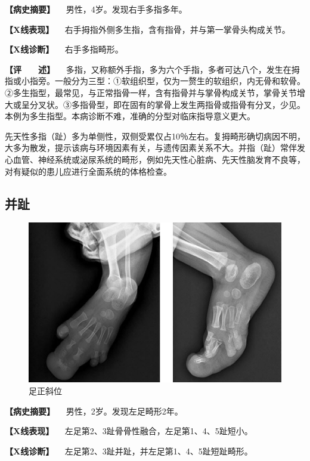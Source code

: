 \textbf{【病史摘要】} 　男性，4岁。发现右手多指多年。

\textbf{【X线表现】}
　右手拇指外侧多生指，含有指骨，并与第一掌骨头构成关节。

\textbf{【X线诊断】} 　右手多指畸形。

\textbf{【评　　述】}
　多指，又称额外手指，多为六个手指，多者可达八个，发生在拇指或小指旁。一般分为三型：①软组织型，仅为一赘生的软组织，内无骨和软骨。②多生指型，最常见，与正常指骨一样，含有指骨并与掌骨构成关节，掌骨关节增大或呈分叉状。③多指骨型，即在固有的掌骨上发生两指骨或指骨有分叉，少见。本例为多生指型。本病诊断不难，准确的分型对临床指导意义更大。

先天性多指（趾）多为单侧性，双侧受累仅占10％左右。复拇畸形确切病因不明，大多为散发，提示该病与环境因素有关，与遗传因素关系不大。并指（趾）常伴发心血管、神经系统或泌尿系统的畸形，例如先天性心脏病、先天性脑发育不良等，对有疑似的患儿应进行全面系统的体格检查。

\subsection{并趾}

\begin{figure}[!htbp]
 \centering
 \includegraphics{./images/Image00025.jpg}
 \captionsetup{justification=centering}
 \caption{足正斜位}
 \label{fig2-2-8}
  \end{figure} 

\textbf{【病史摘要】} 　男性，2岁。发现左足畸形2年。

\textbf{【X线表现】} 　左足第2、3趾骨骨性融合，左足第1、4、5趾短小。

\textbf{【X线诊断】} 　左足第2、3趾并趾，并左足第1、4、5趾短趾畸形。

